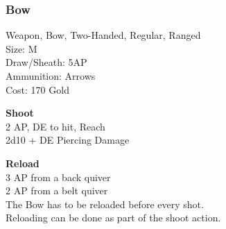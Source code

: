 \subsubsection{Bow}\label{weapon:bow}
Weapon, Bow, Two-Handed, Regular, Ranged\\
Size: M\\
Draw/Sheath: 5AP\\
Ammunition: Arrows\\
Cost: 170 Gold

\textbf{Shoot}\\
2 AP, DE to hit,  Reach\\
2d10 + \texttimes DE Piercing Damage

\textbf{Reload}\\
3 AP from a back quiver\\
2 AP from a belt quiver\\
The Bow has to be reloaded before every shot.\\
Reloading can be done as part of the shoot action.